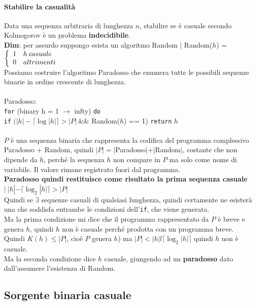 \documentclass[10pt]{book}
\begin{document}
\paragraph{Stabilire la casualità} Data una sequenza arbitraria di lunghezza $n$, stabilire se è casuale secondo Kolmogorov è un problema \textbf{indecidibile}.\\
\textbf{Dim}: per assurdo suppongo esista un algoritmo Random $|$ Random($h$) = $\left\{\begin{array}{l l}
1 & h\:casuale\\
0 & altrimenti
\end{array}\right.$ \\
Possiamo costruire l'algoritmo Paradosso che enumera tutte le possibili sequenze binarie in ordine crescente di lunghezza.\\\\
Paradosso:\\\texttt{for} (binary h = 1 $\to$ infty) \texttt{do}\\
\texttt{if} $(|h| - \lceil\log |h|\rceil > |P|\:\&\&$ Random($h$) == 1) \texttt{return} $h$\\\\
$P$ è una sequenza binaria che rappresenta la codifica del programma complessivo Paradosso + Random, quindi $|P| = |$Paradosso$| + |$Random$|$, costante che non dipende da $h$, perché la sequenza $h$ non compare in $P$ ma solo come nome di variabile. Il valore rimane registrato fuori dal programma.\\
\textbf{Paradosso quindi restituisce come risultato la prima sequenza casuale} $|\:|h| - \lceil\log_2 |h|\rceil > |P|$\\
Quindi se $\exists$ sequenze casuali di qualsiasi lunghezza, quindi certamente ne esisterà una che soddisfa entrambe le condizioni dell'\texttt{if}, che viene generata.\\
Ma la prima condizione mi dice che il programma rappresentato da $P$ è breve e genera $h$, quindi $h$ non è casuale perché prodotta con un programma breve.\\
Quindi $K(h) \leq |P|$, cioè $P$ genera $h$) ma $|P| < |h| l \lceil\log_2|h|\rceil$ quindi $h$ non è casuale.\\
Ma la seconda condizione dice $h$ casuale, giungendo ad un \textbf{paradosso} dato dall'assumere l'esistenza di Random.
\subsection{Sorgente binaria casuale}
\end{document}

